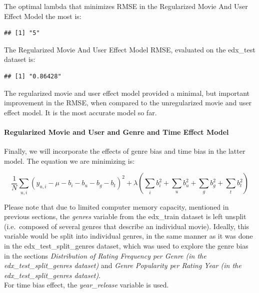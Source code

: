 \documentclass[
]{article}
\let\oldparagraph\paragraph
\renewcommand{\paragraph}[1]{\oldparagraph{#1}\mbox{}}
\begin{document}
The optimal lambda that minimizes RMSE in the Regularized Movie And User
Effect Model the most is:

\begin{verbatim}
## [1] "5"
\end{verbatim}

The Regularized Movie And User Effect Model RMSE, evaluated on the
edx\_test dataset is:

\begin{verbatim}
## [1] "0.86428"
\end{verbatim}

The regularized movie and user effect model provided a minimal, but
important improvement in the RMSE, when compared to the unregularized
movie and user effect model. It is the most accurate model so far.

\hypertarget{regularized-movie-and-user-and-genre-and-time-effect-model}{%
\paragraph{Regularized Movie and User and Genre and Time Effect
Model}\label{regularized-movie-and-user-and-genre-and-time-effect-model}}

Finally, we will incorporate the effects of genre bias and time bias in
the latter model. The equation we are minimizing is:

\[\frac{1}{N} \sum_{u,i} (y_{u,i} - \mu - b_{i} - b_{u} - b_{g} - b_{t})^{2} + \lambda (\sum_{i} b_{i}^2 + \sum_{u} b_{u}^2 + \sum_{g} b_{g}^2 + \sum_{t} b_{t}^2)\]

Please note that due to limited computer memory capacity, mentioned in
previous sections, the \emph{genres} variable from the edx\_train
dataset is left unsplit (i.e.~composed of several genres that describe
an individual movie). Ideally, this variable would be split into
individual genres, in the same manner as it was done in the
edx\_test\_split\_genres dataset, which was used to explore the genre
bias in the sections \emph{Distribution of Rating Frequency per Genre
(in the edx\_test\_split\_genres dataset)} and \emph{Genre Popularity
per Rating Year (in the edx\_test\_split\_genres dataset)}.\\
For time bias effect, the \emph{year\_release} variable is used.
\end{document}
